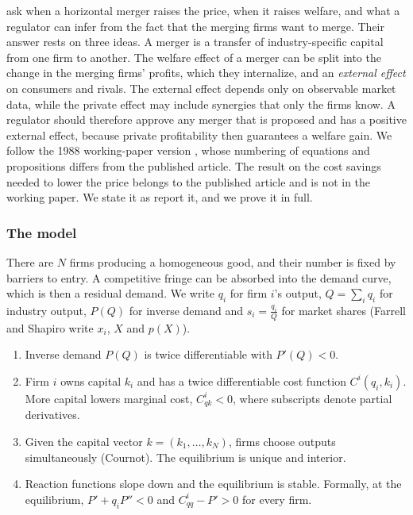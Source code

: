 \citet{FarrellShapiro1990} ask when a horizontal merger raises the price, when it raises welfare, and what a
regulator can infer from the fact that the merging firms want to merge. Their answer rests on three ideas. A merger
is a transfer of industry-specific capital from one firm to another. The welfare effect of a merger can be split
into the change in the merging firms' profits, which they internalize, and an \emph{external effect} on consumers
and rivals. The external effect depends only on observable market data, while the private effect may include
synergies that only the firms know. A regulator should therefore approve any merger that is proposed and has a
positive external effect, because private profitability then guarantees a welfare gain. We follow the 1988
working-paper version \citep{FarrellShapiro1988}, whose numbering of equations and propositions differs from the
published article. The result on the cost savings needed to lower the price belongs to the published article
\citep{FarrellShapiro1990} and is not in the working paper. We state it as \citet[pp.~216--217 and
229]{AskerNocke2021} report it, and we prove it in full.

\subsubsection{The model}

There are $N$ firms producing a homogeneous good, and their number is fixed by barriers to entry. A competitive
fringe can be absorbed into the demand curve, which is then a residual demand. We write $q_i$ for firm $i$'s
output, $Q = \sum_i q_i$ for industry output, $P(Q)$ for inverse demand and $s_i = \frac{q_i}{Q}$ for market
shares (Farrell and Shapiro write $x_i$, $X$ and $p(X)$).

\begin{assumption}\label{ass:11-fs}
\leavevmode
\begin{enumerate}[label=(\roman*)]
  \item Inverse demand $P(Q)$ is twice differentiable with $P'(Q) < 0$.
  \item Firm $i$ owns capital $k_i$ and has a twice differentiable cost function $C^i(q_i, k_i)$. More capital
  lowers marginal cost, $C^i_{qk} < 0$, where subscripts denote partial derivatives.
  \item Given the capital vector $k = (k_1, \dots, k_N)$, firms choose outputs simultaneously (Cournot). The
  equilibrium is unique and interior.
  \item Reaction functions slope down and the equilibrium is stable. Formally, at the equilibrium,
  $P' + q_i P'' < 0$ and $C^i_{qq} - P' > 0$ for every firm.
\end{enumerate}
\end{assumption}


